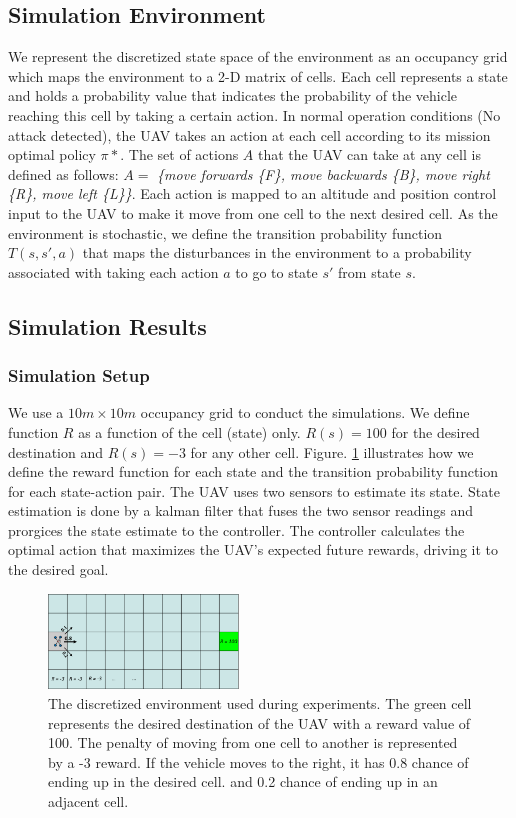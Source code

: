 \documentclass[letterpaper, 10 pt, conference]{ieeeconf}  %
\begin{document}
\subsection{Simulation Environment}
 We represent the discretized state space of the environment as an occupancy grid which maps the environment to a 2-D matrix of cells. Each cell represents a state and holds a probability value that indicates the probability of the vehicle reaching this cell by taking a certain action.
In normal operation conditions (No attack detected), the UAV takes an action at each cell according to its mission optimal policy $\pi*$. The set of actions $A$ that the UAV can take at any cell is defined as follows:
$A =$ \textit{\{move forwards \{F\}, move backwards \{B\}, move right \{R\}, move left \{L\}\}}.
Each action is mapped to an altitude and position control input to the UAV to make it move from one cell to the next desired cell. As the environment is stochastic, we define the transition probability function $T(s,s',a)$ that maps the disturbances in the environment to a probability associated with taking each action $a$ to go to state $s'$ from state $s$.
\subsection{Simulation Results}
\subsubsection{Simulation Setup}
We use a $10m\times10m$ occupancy grid to conduct the simulations. We define function $R$ as a function of the cell (state) only. $R(s) = 100$ for the desired destination and $R(s) = -3$ for any other cell. Figure. \ref{fig:sim-env} illustrates how we define the reward function for each state and the transition probability function for each state-action pair. The UAV uses two sensors to estimate its state. State estimation is done by a kalman filter that fuses the two sensor readings and prorgices the state estimate to the controller. The controller calculates the optimal action that maximizes the UAV's expected future rewards, driving it to the desired goal.
\begin{figure}[h]
\centering
\includegraphics[width=0.45\textwidth]{sim-env}
\caption{The discretized environment used during experiments. The green cell represents the desired destination of the UAV with a reward value of 100. The penalty of moving from one cell to another is represented by a -3 reward. If the vehicle moves to the right, it has 0.8 chance of ending up in the desired cell. and 0.2 chance of ending up in an adjacent cell.}
 \label{fig:sim-env}
\end{figure}
\end{document}
